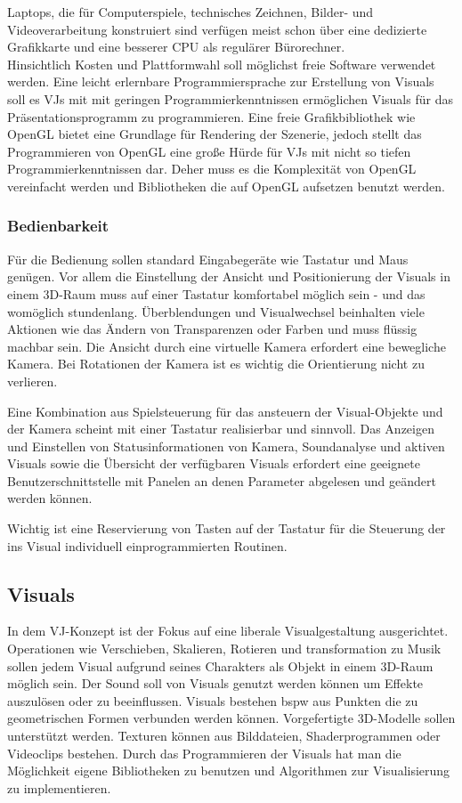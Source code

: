 Laptops, die f\"ur Computerspiele, technisches Zeichnen, Bilder- und Videoverarbeitung  konstruiert sind 
verf\"ugen meist schon \"uber eine dedizierte Grafikkarte und eine besserer CPU als regul\"arer B\"urorechner.
\\
Hinsichtlich Kosten und Plattformwahl soll m\"oglichst freie Software verwendet werden. Eine leicht erlernbare 
Programmiersprache zur Erstellung von Visuals soll es VJs mit mit geringen Programmierkenntnissen erm\"oglichen Visuals
f\"ur das Pr\"asentationsprogramm zu programmieren. Eine freie Grafikbibliothek wie OpenGL bietet eine Grundlage f\"ur 
Rendering der Szenerie, jedoch stellt das Programmieren von OpenGL eine gro\ss e H\"urde f\"ur VJs mit nicht so tiefen
Programmierkenntnissen dar. Deher muss es die Komplexit\"at von OpenGL vereinfacht werden und Bibliotheken die auf OpenGL
aufsetzen benutzt werden.


\subsubsection{Bedienbarkeit}

F\"ur die Bedienung sollen standard Eingabeger\"ate wie Tastatur und Maus gen\"ugen. Vor allem die Einstellung der Ansicht
und Positionierung der Visuals in einem 3D-Raum muss auf einer Tastatur komfortabel m\"oglich sein - und das 
wom\"oglich stundenlang. \"Uberblendungen und Visualwechsel beinhalten viele Aktionen wie das \"Andern von Transparenzen oder
Farben und muss fl\"ussig machbar sein. Die Ansicht durch eine virtuelle Kamera erfordert eine bewegliche Kamera. Bei 
Rotationen der Kamera ist es wichtig die Orientierung nicht zu verlieren.

Eine Kombination aus Spielsteuerung f\"ur das ansteuern der Visual-Objekte und der Kamera scheint mit einer Tastatur 
realisierbar und sinnvoll. Das Anzeigen und Einstellen von Statusinformationen von Kamera,
Soundanalyse und aktiven Visuals sowie die \"Ubersicht der verf\"ugbaren Visuals erfordert eine geeignete 
Benutzerschnittstelle mit Panelen an denen Parameter abgelesen und ge\"andert werden k\"onnen.

Wichtig ist eine Reservierung von Tasten auf der Tastatur  f\"ur die Steuerung der ins Visual individuell einprogrammierten
Routinen.


\subsection{Visuals}

In dem VJ-Konzept ist der Fokus auf eine liberale Visualgestaltung ausgerichtet. Operationen wie Verschieben, Skalieren, 
Rotieren und transformation zu Musik sollen jedem Visual aufgrund seines Charakters als Objekt in einem 3D-Raum m\"oglich sein. 
Der Sound
soll von Visuals genutzt werden k\"onnen um Effekte auszul\"osen oder zu beeinflussen. Visuals bestehen bspw aus Punkten die zu 
geometrischen Formen verbunden werden k\"onnen. Vorgefertigte 3D-Modelle sollen unterst\"utzt werden. Texturen k\"onnen 
aus Bilddateien, Shaderprogrammen oder Videoclips bestehen. Durch das Programmieren der Visuals hat man 
die M\"oglichkeit eigene Bibliotheken zu benutzen und Algorithmen zur Visualisierung zu implementieren. 
 
